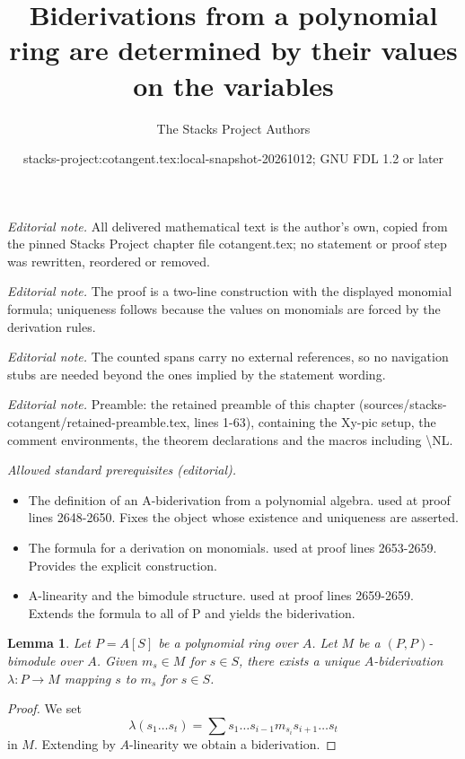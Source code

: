 \documentclass[10pt,a4paper]{amsart}
\title{Biderivations from a polynomial ring are determined by their values on the variables}
\author{The Stacks Project Authors}
\date{stacks-project:cotangent.tex:local-snapshot-20261012; GNU FDL 1.2 or later}
\theoremstyle{plain}
\newtheorem{lemma}[subsection]{Lemma}
\theoremstyle{definition}
\theoremstyle{remark}
\numberwithin{equation}{subsection}
\begin{document}
\maketitle
\setcounter{subsection}{1}
\noindent\textit{Editorial note.} All delivered mathematical text is the author's own, copied from the pinned Stacks Project chapter file cotangent.tex; no statement or proof step was rewritten, reordered or removed.\par\medskip
\noindent\textit{Editorial note.} The proof is a two-line construction with the displayed monomial formula; uniqueness follows because the values on monomials are forced by the derivation rules.\par\medskip
\noindent\textit{Editorial note.} The counted spans carry no external references, so no navigation stubs are needed beyond the ones implied by the statement wording.\par\medskip
\noindent\textit{Editorial note.} Preamble: the retained preamble of this chapter (sources/stacks-cotangent/retained-preamble.tex, lines 1-63), containing the Xy-pic setup, the comment environments, the theorem declarations and the macros including \textbackslash{}NL.\par\medskip
\noindent\textit{Allowed standard prerequisites (editorial).}\begin{itemize}
\item The definition of an A-biderivation from a polynomial algebra. used at proof lines 2648-2650. Fixes the object whose existence and uniqueness are asserted.
\item The formula for a derivation on monomials. used at proof lines 2653-2659. Provides the explicit construction.
\item A-linearity and the bimodule structure. used at proof lines 2659-2659. Extends the formula to all of P and yields the biderivation.
\end{itemize}\medskip
\begin{lemma}
\label{lemma-polynomial-ring-unique}
Let $P = A[S]$ be a polynomial ring over $A$. Let $M$ be a $(P, P)$-bimodule
over $A$. Given $m_s \in M$ for $s \in S$, there exists a unique
$A$-biderivation $\lambda : P \to M$ mapping $s$ to $m_s$ for $s \in S$.
\end{lemma}

\begin{proof}
We set
$$
\lambda(s_1 \ldots s_t) =
\sum s_1 \ldots s_{i - 1} m_{s_i} s_{i + 1} \ldots s_t
$$
in $M$. Extending by $A$-linearity we obtain a biderivation.
\end{proof}
\end{document}
